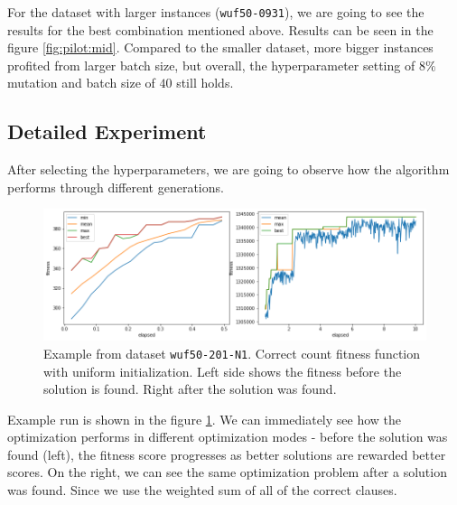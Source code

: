 \documentclass[a4paper,10pt]{article}
\begin{document}
For the dataset with larger instances (\lstinline{wuf50-0931}), we are going to see the results for the best combination mentioned above. Results can be seen in the figure \ref{fig:pilot:mid}. Compared to the smaller dataset, more bigger instances profited from larger batch size, but overall, the hyperparameter setting of $8\%$ mutation and batch size of $40$ still holds.




\subsection{Detailed Experiment}

After selecting the hyperparameters, we are going to observe how the algorithm performs through different generations.

\begin{figure}[!htb]
    \includegraphics[width=\linewidth]{images/medium_side_by_side.png}
    \caption{Example from dataset \lstinline{wuf50-201-N1}. Correct count fitness function with uniform initialization. Left side shows the fitness before the solution is found. Right after the solution was found.}
    \label{fig:example:runtime:sidebyside}
\end{figure}

Example run is shown in the figure \ref{fig:example:runtime:sidebyside}. We can immediately see how the optimization performs in different optimization modes - before the solution was found (left), the fitness score progresses as better solutions are rewarded better scores. On the right, we can see the same optimization problem after a solution was found. Since we use the weighted sum of all of the correct clauses.
\end{document}
